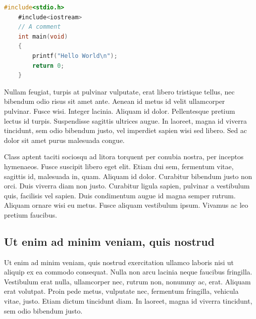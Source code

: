 \begin{lstlisting}[caption={Zbytečný kód},label=list:8-6,captionpos=b,float,abovecaptionskip=-\medskipamount,abovecaptionskip=\medskipamount,language=C]
    #include<stdio.h>
    #include<iostream>
    // A comment
    int main(void)
    {
        printf("Hello World\n");
        return 0;
    }
\end{lstlisting}

Nullam feugiat, turpis at pulvinar vulputate, erat libero tristique tellus, nec bibendum odio risus sit amet ante. Aenean id metus id velit ullamcorper pulvinar. Fusce wisi. Integer lacinia. Aliquam id dolor. Pellentesque pretium lectus id turpis. Suspendisse sagittis ultrices augue. In laoreet, magna id viverra tincidunt, sem odio bibendum justo, vel imperdiet sapien wisi sed libero. Sed ac dolor sit amet purus malesuada congue.~\parencite{Crochemore2002}

Class aptent taciti sociosqu ad litora torquent per conubia nostra, per inceptos hymenaeos. Fusce suscipit libero eget elit. Etiam dui sem, fermentum vitae, sagittis id, malesuada in, quam. Aliquam id dolor. Curabitur bibendum justo non orci. Duis viverra diam non justo. Curabitur ligula sapien, pulvinar a vestibulum quis, facilisis vel sapien. Duis condimentum augue id magna semper rutrum. Aliquam ornare wisi eu metus. Fusce aliquam vestibulum ipsum. Vivamus ac leo pretium faucibus.~\cite{Motwani2014}

\subsection{Ut enim ad minim veniam, quis nostrud}

Ut enim ad minim veniam, quis nostrud exercitation ullamco laboris nisi ut aliquip ex ea commodo consequat. Nulla non arcu lacinia neque faucibus fringilla. Vestibulum erat nulla, ullamcorper nec, rutrum non, nonummy ac, erat. Aliquam erat volutpat. Proin pede metus, vulputate nec, fermentum fringilla, vehicula vitae, justo. Etiam dictum tincidunt diam. In laoreet, magna id viverra tincidunt, sem odio bibendum justo.~\cite{Sestakova2018} 

